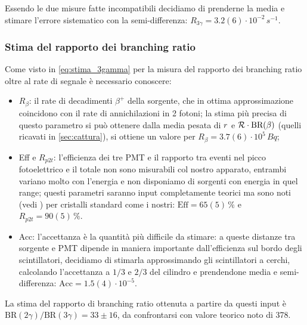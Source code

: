 Essendo le due misure fatte incompatibili decidiamo di prenderne la media e stimare l'errore sistematico con la semi-differenza: $R_{3\gamma} = 3.2(6)\cdot 10^{-2}\,\si{s^{-1}}$.

\subsubsection{Stima del rapporto dei branching ratio}
Come visto in \autoref{eq:stima_3gamma} per la misura del rapporto dei branching ratio oltre al rate di segnale è necessario conoscere:
\begin{itemize}
	\item $R_{\beta}$: il rate di decadimenti $\beta^+$ della sorgente, che in ottima approssimazione coincidono con il rate di annichilazioni in 2 fotoni; la stima più precisa di questo parametro si può ottenere dalla media pesata di $r$ e $\mathcal{R} \cdot \text{BR}(\beta)$ (quelli ricavati in \autoref{sec:cattura}), si ottiene un valore per $R_{\beta} = 3.7(6)\cdot 10^5\,\si{Bq}$;
	\item Eff e $R_{p2t}$: l'efficienza dei tre PMT e il rapporto tra eventi nel picco fotoelettrico e il totale non sono misurabili col nostro apparato, entrambi variano molto con l'energia e non disponiamo di sorgenti con energia in quel range; questi parametri saranno input completamente teorici ma sono noti (vedi \cite{3}) per cristalli standard come i nostri: $\text{Eff} = 65(5)\,\%$ e $R_{p2t} = 90(5)\,\%$.
	\item Acc: l'accettanza è la quantità più difficile da stimare: a queste distanze tra sorgente e PMT dipende in maniera importante dall'efficienza sul bordo degli scintillatori, decidiamo di stimarla approssimando gli scintillatori a cerchi, calcolando l'accettanza a $1/3$ e $2/3$ del cilindro e prendendone media e semi-differenza: $\text{Acc} = 1.5(4)\cdot 10^{-5}$. 
\end{itemize}

La stima del rapporto di branching ratio ottenuta a partire da questi input è $\text{BR}(2\gamma) / \text{BR}(3\gamma) = 33 \pm 16$, da confrontarsi con valore teorico noto di 378.

